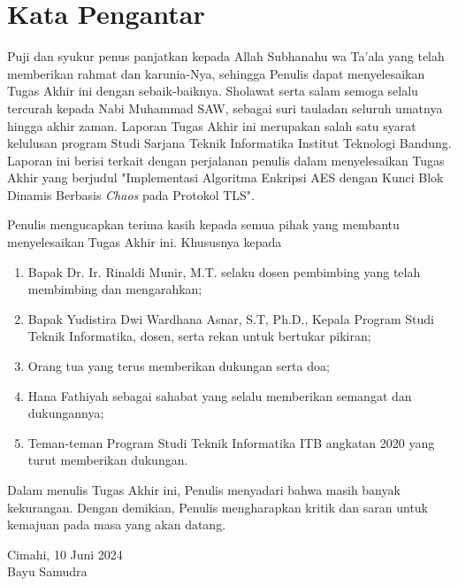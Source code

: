 \chapter*{Kata Pengantar}

Puji dan syukur penus panjatkan kepada Allah Subhanahu wa Ta'ala yang telah memberikan rahmat dan karunia-Nya, sehingga Penulis dapat menyelesaikan Tugas Akhir ini dengan sebaik-baiknya. Sholawat serta salam semoga selalu tercurah kepada Nabi Muhammad SAW, sebagai suri tauladan seluruh umatnya hingga akhir zaman. Laporan Tugas Akhir ini merupakan salah satu syarat kelulusan program Studi Sarjana Teknik Informatika Institut Teknologi Bandung. Laporan ini berisi terkait dengan perjalanan penulis dalam menyelesaikan Tugas Akhir yang berjudul "Implementasi Algoritma Enkripsi AES dengan Kunci Blok Dinamis Berbasis \emph{Chaos} pada Protokol TLS".

Penulis mengucapkan terima kasih kepada semua pihak yang membantu menyelesaikan Tugas Akhir ini. Khususnya kepada
\begin{enumerate}
  \item Bapak Dr. Ir. Rinaldi Munir, M.T. selaku dosen pembimbing yang telah membimbing dan mengarahkan;
  \item Bapak Yudistira Dwi Wardhana Asnar, S.T, Ph.D., Kepala Program Studi Teknik Informatika, dosen, serta rekan untuk bertukar pikiran;
  \item Orang tua yang terus memberikan dukungan serta doa;
  \item Hana Fathiyah sebagai sahabat yang selalu memberikan semangat dan dukungannya;
  \item Teman-teman Program Studi Teknik Informatika ITB angkatan 2020 yang turut memberikan dukungan.
\end{enumerate}

Dalam menulis Tugas Akhir ini, Penulis menyadari bahwa masih banyak kekurangan. Dengan demikian, Penulis mengharapkan kritik dan saran untuk kemajuan pada masa yang akan datang.

\begin{flushright}
  Cimahi, 10 Juni 2024 \\


  Bayu Samudra
\end{flushright}